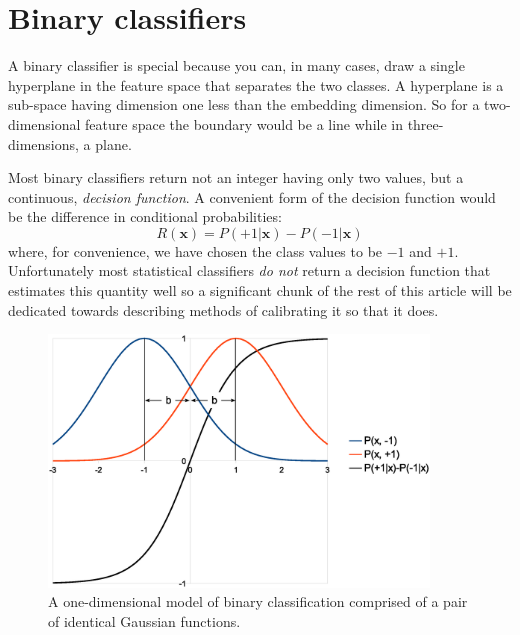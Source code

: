 \documentclass{article}
\renewcommand{\vec}[1]{\boldsymbol{#1}}
\begin{document}
\section{Binary classifiers}

A binary classifier is special because you can, in many cases, draw a single
hyperplane in the feature space that separates the two classes.
A hyperplane is a sub-space having dimension one less than the embedding 
dimension.
So for a two-dimensional feature space the boundary would be a line while in
three-dimensions, a plane.

Most binary classifiers return not an integer having only two values, but
a continuous, {\it decision function}.
A convenient form of the decision function would be the difference in
conditional probabilities:
\begin{equation}
	R(\vec x) = P(+1|\vec x) - P(-1|\vec x)
	\label{decision}
\end{equation}
where, for convenience, we have chosen the class values to be $-1$ and $+1$.
Unfortunately most statistical classifiers {\it do not} return a decision
function that estimates this quantity well
so a significant chunk of the rest of this article will be dedicated
towards describing methods of calibrating it so that it does.

\begin{figure}
	\includegraphics[width=0.9\textwidth]{logistic1}
	\caption{A one-dimensional model of binary classification comprised of a pair of identical Gaussian functions.}
	\label{model}
\end{figure}
\end{document}

